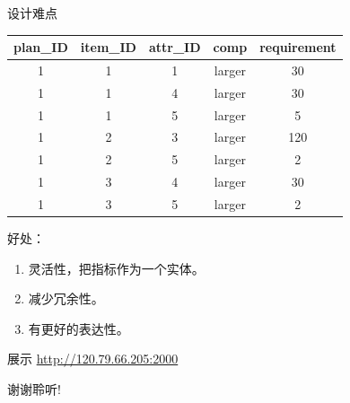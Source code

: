 \documentclass{beamer}
\begin{document}
\begin{frame}{设计难点}
{  }
  

   {

    \begin{tabular}{|c|c|c|c|c|}
      \hline
      plan\_ID & item\_ID & attr\_ID & comp   & requirement  \\ \hline
      1 &       1 &       1 & larger &          30  \\ \hline
      1 &       1 &       4 & larger &          30  \\ \hline
      1 &       1 &       5 & larger &           5  \\ \hline
      1 &       2 &       3 & larger &         120  \\ \hline
      1 &       2 &       5 & larger &           2  \\ \hline
      1 &       3 &       4 & larger &          30  \\ \hline
      1 &       3 &       5 & larger &           2  \\ \hline
      \end{tabular}

    好处：
    \begin{enumerate}
    \item 灵活性，把指标作为一个实体。
    \item 减少冗余性。
    \item 有更好的表达性。
    \end{enumerate}
  }
    
\end{frame}
  
\begin{frame}{展示}
\url{http://120.79.66.205:2000}
\end{frame}

\begin{frame}
  \begin{center}
    \huge{谢谢聆听!}
  \end{center}
\end{frame}
\end{document}
